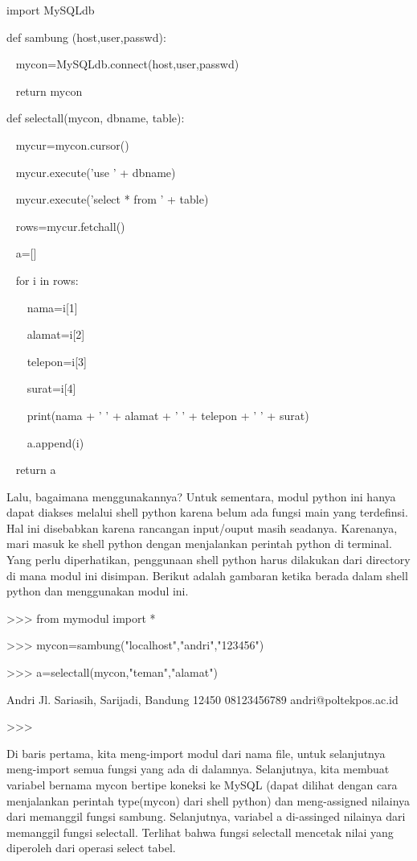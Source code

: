 \vspace{12pt}
\noindent 
import MySQLdb \par
\noindent 
def sambung (host,user,passwd): \par
\noindent 
~ mycon=MySQLdb.connect(host,user,passwd) \par
\noindent 
~ return mycon \par
\vspace{12pt}
\noindent 
def selectall(mycon, dbname, table): \par
\noindent 
~ mycur=mycon.cursor() \par
\noindent 
~ mycur.execute('use ' + dbname) \par
\noindent 
~ mycur.execute('select * from ' + table) \par
\noindent 
~ rows=mycur.fetchall() \par
\noindent 
~ a=[] \par
\noindent 
~ for i in rows: \par
\noindent 
~~~ nama=i[1] \par
\noindent 
~~~ alamat=i[2] \par
\noindent 
~~~ telepon=i[3] \par
\noindent 
~~~ surat=i[4] \par
\noindent 
~~~ print(nama + ' ' + alamat + ' ' + telepon + ' ' + surat) \par
\noindent 
~~~ a.append(i) \par
\noindent 
~ return a \par
Lalu, bagaimana menggunakannya? Untuk sementara, modul python ini hanya dapat diakses melalui shell python karena belum ada fungsi main yang terdefinsi. Hal ini disebabkan karena rancangan input/ouput masih seadanya. Karenanya, mari masuk ke shell python dengan menjalankan perintah python di terminal. Yang perlu diperhatikan, penggunaan shell python harus dilakukan dari directory di mana modul ini disimpan. Berikut adalah gambaran ketika berada dalam shell python dan menggunakan modul ini. \par
\noindent 
>>> from mymodul import * \par
\noindent 
>>> mycon=sambung("localhost","andri","123456") \par
\noindent 
>>> a=selectall(mycon,"teman","alamat") \par
\noindent 
Andri Jl. Sariasih, Sarijadi, Bandung 12450 08123456789 andri@poltekpos.ac.id \par
\noindent 
>>> \par
Di baris pertama, kita meng-import modul dari nama file, untuk selanjutnya meng-import semua fungsi yang ada di dalamnya. Selanjutnya, kita membuat variabel bernama mycon bertipe koneksi ke MySQL (dapat dilihat dengan cara menjalankan perintah type(mycon) dari shell python) dan meng-assigned nilainya dari memanggil fungsi sambung. Selanjutnya, variabel a di-assinged nilainya dari memanggil fungsi selectall. Terlihat bahwa fungsi selectall mencetak nilai yang diperoleh dari operasi select tabel. \par
